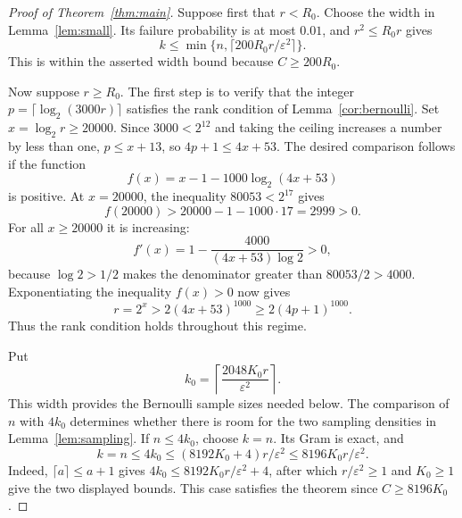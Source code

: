 \documentclass[11pt]{article}
\theoremstyle{definition}
\theoremstyle{remark}
\theoremstyle{plain}
\begin{document}
\begin{proof}[Proof of Theorem~\ref{thm:main}]
Suppose first that $r<R_0$. Choose the width in
Lemma~\ref{lem:small}. Its failure probability is at most $0.01$,
and $r^2\le R_0r$ gives
\[
 k\le\min\{n,\lceil200R_0r/\varepsilon^2\rceil\}.
\]
This is within the asserted width bound because $C\ge200R_0$.

Now suppose $r\ge R_0$. The first step is to verify that the
integer \(p=\lceil\log_2(3000r)\rceil\) satisfies the rank condition
of Lemma~\ref{cor:bernoulli}. Set $x=\log_2r\ge20000$.
Since $3000<2^{12}$ and taking the ceiling increases a number by
less than one, $p\le x+13$, so $4p+1\le4x+53$.
The desired comparison follows if the function
\[
 f(x)=x-1-1000\log_2(4x+53)
\]
is positive. At $x=20000$, the inequality $80053<2^{17}$ gives
\[
 f(20000)>20000-1-1000\cdot17=2999>0.
\]
For all $x\ge20000$ it is increasing:
\[
 f'(x)=1-\frac{4000}{(4x+53)\log2}>0,
\]
because $\log2>1/2$ makes the denominator greater than
$80053/2>4000$. Exponentiating the inequality $f(x)>0$ now gives
\[
 r=2^x>2(4x+53)^{1000}\ge2(4p+1)^{1000}.
\]
Thus the rank condition holds throughout this regime.

Put
\begin{equation}\label{eq:large-rank-width}
                    k_0=\left\lceil
                            \frac{2048K_0r}{\varepsilon^2}
                          \right\rceil.
\end{equation}
This width provides the Bernoulli sample sizes needed below. The
comparison of $n$ with $4k_0$ determines whether there is room for
the two sampling densities in Lemma~\ref{lem:sampling}.
If \(n\le4k_0\), choose \(k=n\). Its Gram is exact, and
\begin{equation}\label{eq:full-width-bound}
 k=n\le4k_0\le(8192K_0+4)r/\varepsilon^2
                         \le8196K_0r/\varepsilon^2.
\end{equation}
Indeed, $\lceil a\rceil\le a+1$ gives
$4k_0\le8192K_0r/\varepsilon^2+4$, after which
$r/\varepsilon^2\ge1$ and $K_0\ge1$ give the two displayed bounds.
This case satisfies the theorem since $C\ge8196K_0$.


\end{proof}
\end{document}
